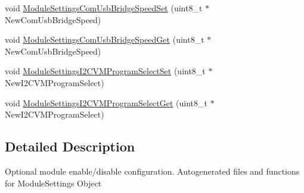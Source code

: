 \begin{DoxyCompactItemize}
\item 
void \hyperlink{group___module_settings_ga2145b0a7bb7365e2ed47a81f624225cf}{\-Module\-Settings\-Com\-Usb\-Bridge\-Speed\-Set} (uint8\-\_\-t $\ast$\-New\-Com\-Usb\-Bridge\-Speed)
\item 
void \hyperlink{group___module_settings_ga3ccd5a1fa9ca90946a5cd1d43b597e43}{\-Module\-Settings\-Com\-Usb\-Bridge\-Speed\-Get} (uint8\-\_\-t $\ast$\-New\-Com\-Usb\-Bridge\-Speed)
\item 
void \hyperlink{group___module_settings_ga4121bea494d8a919959a47ecc3a53bc9}{\-Module\-Settings\-I2\-C\-V\-M\-Program\-Select\-Set} (uint8\-\_\-t $\ast$\-New\-I2\-C\-V\-M\-Program\-Select)
\item 
void \hyperlink{group___module_settings_ga53bf5228b16f8fcbe01472078fe864ba}{\-Module\-Settings\-I2\-C\-V\-M\-Program\-Select\-Get} (uint8\-\_\-t $\ast$\-New\-I2\-C\-V\-M\-Program\-Select)
\end{DoxyCompactItemize}


\subsection{\-Detailed \-Description}
\-Optional module enable/disable configuration. \-Autogenerated files and functions for \-Module\-Settings \-Object 

